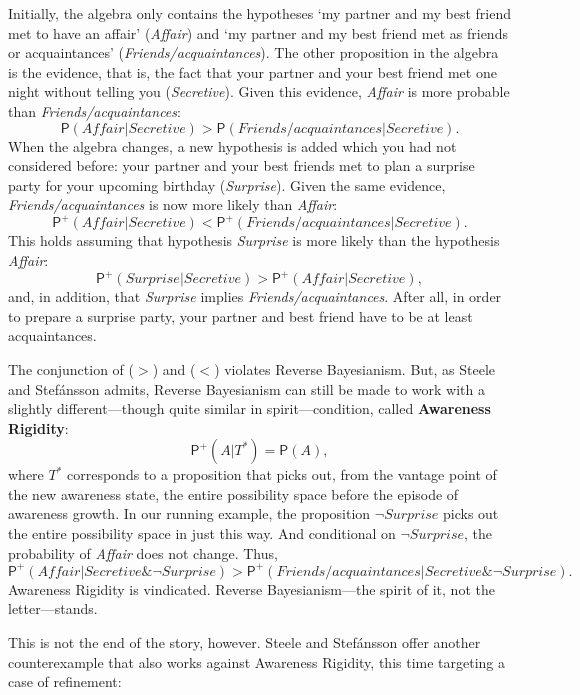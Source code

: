 \documentclass[
  11pt,
  dvipsnames,enabledeprecatedfontcommands]{scrartcl}
\newcommand{\pr}[1]{\ensuremath{\mathsf{P}(#1)}}
\newcommand{\ppr}[2]{\ensuremath{\mathsf{P}^{#1}(#2)}}
\begin{document}
\noindent Initially, the algebra only contains the hypotheses `my
partner and my best friend met to have an affair' (\textit{Affair}) and
`my partner and my best friend met as friends or acquaintances'
(\textit{Friends/acquaintances}). The other proposition in the algebra
is the evidence, that is, the fact that your partner and your best
friend met one night without telling you (\textit{Secretive}). Given
this evidence, \textit{Affair} is more probable than
\textit{Friends/acquaintances}:
\[\pr{\textit{Affair} \vert  \textit{Secretive} }> \pr{\textit{Friends/acquaintances} \vert \textit{Secretive}} \tag{>}.\]
When the algebra changes, a new hypothesis is added which you had not
considered before: your partner and your best friends met to plan a
surprise party for your upcoming birthday (\textit{Surprise}). Given the
same evidence, \textit{Friends/acquaintances} is now more likely than
\textit{Affair}:
\[\ppr{+}{\textit{Affair} \vert  \textit{Secretive} } < \ppr{+}{\textit{Friends/acquaintances} \vert \textit{Secretive}}. \tag{<}\]
This holds assuming that hypothesis \textit{Surprise} is more likely
than the hypothesis \textit{Affair}:
\[\ppr{+}{ \textit{Surprise} \vert \textit{Secretive}}> \ppr{+}{ \textit{Affair} \vert \textit{Secretive}},\]
and, in addition, that \textit{Surprise} implies
\textit{Friends/acquaintances}. After all, in order to prepare a
surprise party, your partner and best friend have to be at least
acquaintances.

The conjunction of (\(>\)) and (\(<\)) violates Reverse Bayesianism.
But, as Steele and Stefánsson admits, Reverse Bayesianism can still be
made to work with a slightly different---though quite similar in
spirit---condition, called \textbf{Awareness Rigidity}:
\[\ppr{+}{A \vert T^*}=\pr{A},\] where \(T^*\) corresponds to a
proposition that picks out, from the vantage point of the new awareness
state, the entire possibility space before the episode of awareness
growth. In our running example, the proposition
\(\neg\textit{Surprise}\) picks out the entire possibility space in just
this way. And conditional on \(\neg\textit{Surprise}\), the probability
of \textit{Affair} does not change. Thus,
\[\ppr{+}{\textit{Affair} \vert  \textit{Secretive} \& \neg\textit{Surprise} } > \ppr{+}{\textit{Friends/acquaintances} \vert \textit{Secretive} \& \neg\textit{Surprise}}. \]
Awareness Rigidity is vindicated. Reverse Bayesianism---the spirit of
it, not the letter---stands.

This is not the end of the story, however. Steele and Stefánsson offer
another counterexample that also works against Awareness Rigidity, this
time targeting a case of refinement:
\end{document}
